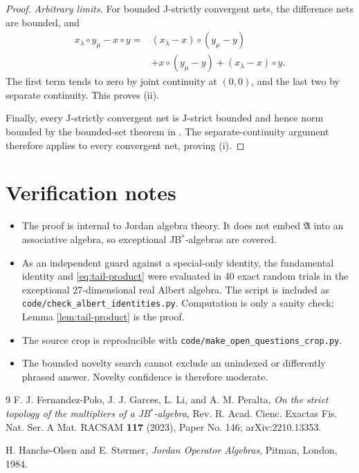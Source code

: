 \documentclass[11pt]{article}
\newcommand{\A}{\mathfrak A}
\begin{document}
\begin{proof}
\smallskip
\noindent\emph{Arbitrary limits.}
For bounded J-strictly convergent nets, the difference nets are bounded, and
\[
\begin{aligned}
x_\lambda\circ y_\mu-x\circ y
={}&(x_\lambda-x)\circ(y_\mu-y)\\
&+x\circ(y_\mu-y)+(x_\lambda-x)\circ y.
\end{aligned}
\]
The first term tends to zero by joint continuity at \((0,0)\), and the last
two by separate continuity. This proves (ii).

Finally, every J-strictly convergent net is J-strict bounded and hence norm
bounded by the bounded-set theorem in \cite{FGLP}. The separate-continuity
argument therefore applies to every convergent net, proving (i).
\end{proof}

\section*{Verification notes}

\begin{itemize}[leftmargin=*]
\item The proof is internal to Jordan algebra theory. It does not embed
      \(\A\) into an associative algebra, so exceptional JB$^*$-algebras are
      covered.
\item As an independent guard against a special-only identity, the
      fundamental identity and \eqref{eq:tail-product} were evaluated in 40
      exact random trials in the exceptional 27-dimensional real Albert
      algebra. The script is included as
      \texttt{code/check\_albert\_identities.py}. Computation is only a sanity
      check; Lemma \ref{lem:tail-product} is the proof.
\item The source crop is reproducible with
      \texttt{code/make\_open\_questions\_crop.py}.
\item The bounded novelty search cannot exclude an unindexed or differently
      phrased answer. Novelty confidence is therefore moderate.
\end{itemize}

\begin{thebibliography}{9}
F. J. Fernandez-Polo, J. J. Garces, L. Li, and A. M. Peralta,
\emph{On the strict topology of the multipliers of a JB$^*$-algebra},
Rev. R. Acad. Cienc. Exactas Fis. Nat. Ser. A Mat. RACSAM
\textbf{117} (2023), Paper No. 146; arXiv:2210.13353.

H. Hanche-Olsen and E. St{\o}rmer,
\emph{Jordan Operator Algebras}, Pitman, London, 1984.
\end{thebibliography}
\end{document}
